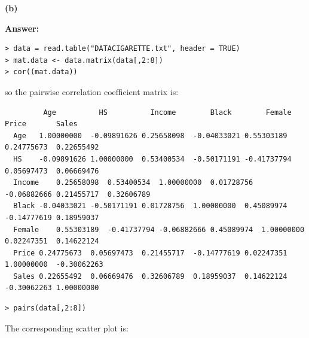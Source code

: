 \documentclass[letterpaper,11pt]{article}
\begin{document}
\begin{addmargin}[-1.1em]{0em}
  \textbf{(b)}\par
\end{addmargin}
\textbf{}\par
\bigbreak
\begin{addmargin}[-0.5em]{0em}
  \textbf{Answer: }
\end{addmargin}

\begin{lstlisting}
> data = read.table("DATACIGARETTE.txt", header = TRUE)
> mat.data <- data.matrix(data[,2:8])
> cor((mat.data))
\end{lstlisting}
so the pairwise correlation coefficient matrix is:
\begin{lstlisting}
         Age	      HS	      Income	    Black	     Female	    Price	    Sales
  Age	1.00000000	-0.09891626	0.25658098	-0.04033021	0.55303189	0.24775673	0.22655492
  HS	-0.09891626	1.00000000	0.53400534	-0.50171191	-0.41737794	0.05697473	0.06669476
  Income	0.25658098	0.53400534	1.00000000	0.01728756	-0.06882666	0.21455717	0.32606789
  Black	-0.04033021	-0.50171191	0.01728756	1.00000000	0.45089974	-0.14777619	0.18959037
  Female	0.55303189	-0.41737794	-0.06882666	0.45089974	1.00000000	0.02247351	0.14622124
  Price	0.24775673	0.05697473	0.21455717	-0.14777619	0.02247351	1.00000000	-0.30062263
  Sales	0.22655492	0.06669476	0.32606789	0.18959037	0.14622124	-0.30062263	1.00000000
\end{lstlisting}


\begin{lstlisting}
> pairs(data[,2:8])
\end{lstlisting}

The corresponding scatter plot is:
\begin{center} 
\end{center}
\end{document}
